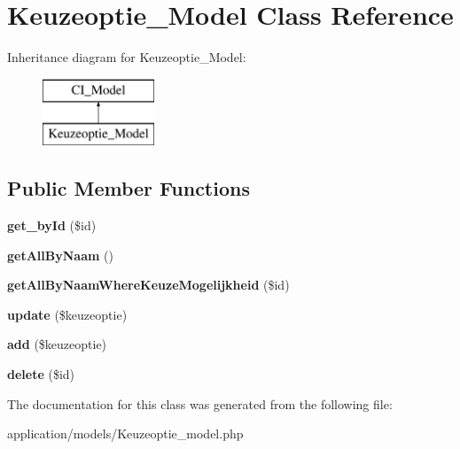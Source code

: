\hypertarget{class_keuzeoptie___model}{}\section{Keuzeoptie\+\_\+\+Model Class Reference}
\label{class_keuzeoptie___model}
Inheritance diagram for Keuzeoptie\+\_\+\+Model\+:\begin{figure}[H]
\begin{center}
\leavevmode
\includegraphics[height=2.000000cm]{class_keuzeoptie___model}
\end{center}
\end{figure}
\subsection*{Public Member Functions}
\begin{DoxyCompactItemize}
\item 
\mbox{\label{class_keuzeoptie___model_a98d28a4d9a29d40c5a8aa0176f19a919}} 
{\bfseries get\+\_\+by\+Id} (\$id)
\item 
\mbox{\label{class_keuzeoptie___model_a2b035b1ffd1cbe651b35bb3e53d72c09}} 
{\bfseries get\+All\+By\+Naam} ()
\item 
\mbox{\label{class_keuzeoptie___model_a6f3e4d26ab480501524eabb01683f5f7}} 
{\bfseries get\+All\+By\+Naam\+Where\+Keuze\+Mogelijkheid} (\$id)
\item 
\mbox{\label{class_keuzeoptie___model_a9d98d1a6c3919a0e7b946d37fa385948}} 
{\bfseries update} (\$keuzeoptie)
\item 
\mbox{\label{class_keuzeoptie___model_a2452f524e794bc3f418d60cb296e19b5}} 
{\bfseries add} (\$keuzeoptie)
\item 
\mbox{\label{class_keuzeoptie___model_a2f8258add505482d7f00ea26493a5723}} 
{\bfseries delete} (\$id)
\end{DoxyCompactItemize}


The documentation for this class was generated from the following file\+:\begin{DoxyCompactItemize}
\item 
application/models/Keuzeoptie\+\_\+model.\+php\end{DoxyCompactItemize}
